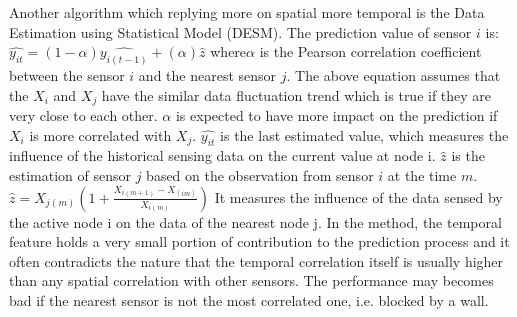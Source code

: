 Another algorithm which replying more on spatial more temporal is the Data Estimation using Statistical Model (DESM)\cite{li2008data}.  
The prediction value of sensor $i$ is:
$\hat{y_{it}} = (1-\alpha)\hat{y_{i(t-1)}} + (\alpha)\hat{z}$
where$\alpha$ is the Pearson correlation coefficient between the sensor $i$ and the nearest sensor $j$.
The above equation assumes that the $X_i$ and $X_j$ have the similar data fluctuation trend which is true if they are very close to each other. 
$\alpha$ is expected to have more impact on the prediction if $X_i$ is more correlated with $X_j$. 
$\hat{y_{it}}$ is the last estimated value, which measures the influence of the historical sensing data on the current value at node i. 
$\hat{z}$ is the estimation of sensor $j$ based on the observation from sensor $i$ at the time $m$. 
$\hat{z} = X_{j(m)}(1+\frac{X_{i(m+1)}-X_{(im)}}{X_{i(m)}})$
It measures the influence of the data sensed by the active node i on the data of the nearest node j.  
In the method, the temporal feature holds a very small portion of contribution to the prediction process and it often contradicts the nature that the temporal correlation itself is usually higher than any spatial correlation with other sensors. The performance may becomes bad if the nearest sensor is not the most correlated one, i.e. blocked by a wall.

